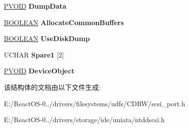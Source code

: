 \begin{DoxyCompactItemize}
\hyperlink{interfacevoid}{P\+V\+O\+ID} {\bfseries Dump\+Data}
\item 
\mbox{\label{struct___d_u_m_p___p_o_i_n_t_e_r_s_a5208af3a97e1504e5b3e989947a7afa8}} 
\hyperlink{_processor_bind_8h_a112e3146cb38b6ee95e64d85842e380a}{B\+O\+O\+L\+E\+AN} {\bfseries Allocate\+Common\+Buffers}
\item 
\mbox{\label{struct___d_u_m_p___p_o_i_n_t_e_r_s_a7a99f069eb9dfc7239ca3620eddc876a}} 
\hyperlink{_processor_bind_8h_a112e3146cb38b6ee95e64d85842e380a}{B\+O\+O\+L\+E\+AN} {\bfseries Use\+Disk\+Dump}
\item 
\mbox{\label{struct___d_u_m_p___p_o_i_n_t_e_r_s_ac0b224688b0431c5b87ee841282ab196}} 
U\+C\+H\+AR {\bfseries Spare1} \mbox{[}2\mbox{]}
\item 
\mbox{\label{struct___d_u_m_p___p_o_i_n_t_e_r_s_a1872e1b823f6aeb1a19cc3fd801bc1de}} 
\hyperlink{interfacevoid}{P\+V\+O\+ID} {\bfseries Device\+Object}
\end{DoxyCompactItemize}


该结构体的文档由以下文件生成\+:\begin{DoxyCompactItemize}
\item 
E\+:/\+React\+O\+S-\/0../drivers/filesystems/udfs/\+C\+D\+R\+W/scsi\+\_\+port.\+h\item 
E\+:/\+React\+O\+S-\/0../drivers/storage/ide/uniata/ntddscsi.\+h\end{DoxyCompactItemize}

